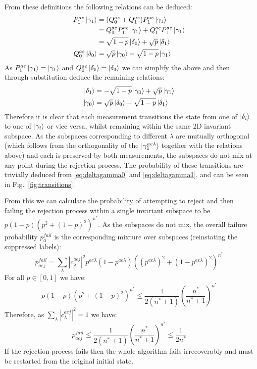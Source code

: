 \documentclass[aps,floatfix,10pt,amssymb,amsfont,amsmath,superscriptaddress,float,nofootinbib,longbibliography,nobalancelastpage,twocolumn]{revtex4-2}
\begin{document}
From these definitions the following relations can be deduced:
\begin{align}
\begin{split}
\label{eq:deltagamma0}
    P^{ae}_1 \ket{\gamma_1} &= (Q^{ae}_0+Q^{ae}_1)P^{ae}_1 \ket{\gamma_1}\\
    &= Q^{ae}_0P^{ae}_1 \ket{\gamma_1}+Q^{ae}_1P^{ae}_1 \ket{\gamma_1}\\
    &= \sqrt{1-p} \ket{\delta_0} + \sqrt{p}\ket{\delta_1}\\
    Q^{ae}_0\ket{\delta_0} &= \sqrt{p} \ket{\gamma_0} + \sqrt{1-p} \ket{\gamma_1}
\end{split}
\end{align}
As $P^{ae}_1 \ket{\gamma_1} = \ket{\gamma_1}$ and $Q^{ae}_0\ket{\delta_0} = \ket{\delta_0}$ we can simplify the above and then through substitution deduce the remaining relations:
\begin{align}
\begin{split}
\label{eq:deltagamma1}
        \ket{\delta_1} &= -\sqrt{1-p} \ket{\gamma_0} + \sqrt{p} \ket{\gamma_1}\\
    \ket{\gamma_0} &= \sqrt{p} \ket{\delta_0} - \sqrt{1-p}\ket{\delta_1}
\end{split}
\end{align}
Therefore it is clear that each measurement transitions the state from one of $\ket{\delta_i}$ to one of $\ket{\gamma_i}$ or vice versa, whilst remaining within the same 2D invariant subspace. As the subspaces corresponding to different $\lambda$ are mutually orthogonal (which follows from the orthogonality of the $\ket{\gamma^{ae\lambda}_1}$ together with the relations above) and each is preserved by both measurements, the subspaces do not mix at any point during the rejection process. The probability of these transitions are trivially deduced from \eqref{eq:deltagamma0} and \eqref{eq:deltagamma1}, and can be seen in Fig.~\ref{fig:transitions}.

From this we can calculate the probability of attempting to reject and then failing the rejection process within a single invariant subspace to be $p(1-p)(p^2 +(1-p)^2)^{n^*}$. As the subspaces do not mix, the overall failure probability $p_a^{fail}$ is the corresponding mixture over subspaces (reinstating the suppressed labels):
\begin{equation}
   p_{aej}^{fail} =  \sum_{\lambda}|c^{aej}_{\lambda}|^2p^{ae\lambda}(1-p^{ae\lambda})((p^{ae\lambda})^2 +(1-p^{ae\lambda})^2)^{n^*}
\end{equation}
For all $p \in [0,1]$ we have: 
\begin{equation}
    p(1-p)(p^2 +(1-p)^2)^{n^*} \leq \frac{1}{2(n^*+1)} \left(\frac{n^*}{n^*+1}\right)^{n^*}
\end{equation}
Therefore, as $\sum_{\lambda}|c^{aej}_{\lambda}|^2=1$ we have:
\begin{equation}
    \label{eq:probabilty_of_rejection}
   p_{aej}^{fail} \leq \frac{1}{2(n^*+1)} \left(\frac{n^*}{n^*+1}\right)^{n^*} \leq \frac{1}{2n^*}
\end{equation}
If the rejection process fails then the whole algorithm fails irrecoverably and must be restarted from the original initial state.
\end{document}
